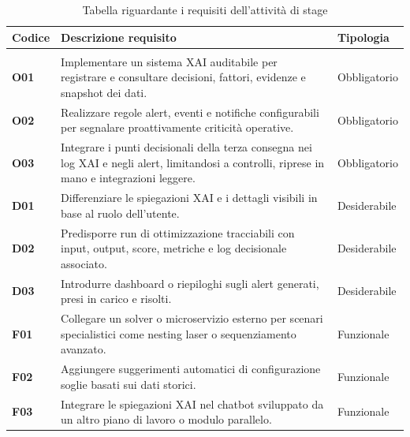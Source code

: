 \begin{center}
    \keepXColumns
        \begin{longtable}{|l|p{}|l|}
            \hline
            \rowcolor{gold}
            \textbf{Codice} & \textbf{Descrizione requisito} & \textbf{Tipologia} \\
            \hline
            \endhead

            \hline
            \rowcolor{white}
            \caption{Tabella riguardante i requisiti dell'attività di stage} \label{tab:requisiti_stage} \\
            \endlastfoot 

            \textbf{O01} & Implementare un sistema XAI auditabile per registrare e consultare decisioni, fattori, evidenze e snapshot dei dati. & Obbligatorio\\
            \hline
            \textbf{O02} & Realizzare regole alert, eventi e notifiche configurabili per segnalare proattivamente criticità operative. & Obbligatorio\\
            \hline
            \textbf{O03} & Integrare i punti decisionali della terza consegna nei log XAI e negli alert, limitandosi a controlli, riprese in mano e integrazioni leggere. & Obbligatorio\\
            \hline
            \textbf{D01} & Differenziare le spiegazioni XAI e i dettagli visibili in base al ruolo dell'utente. & Desiderabile\\
            \hline
            \textbf{D02} & Predisporre run di ottimizzazione tracciabili con input, output, score, metriche e log decisionale associato. & Desiderabile\\
            \hline
            \textbf{D03} & Introdurre dashboard o riepiloghi sugli alert generati, presi in carico e risolti. & Desiderabile\\
            \hline
            \textbf{F01} & Collegare un solver o microservizio esterno per scenari specialistici come nesting laser o sequenziamento avanzato. & Funzionale\\
            \hline
            \textbf{F02} & Aggiungere suggerimenti automatici di configurazione soglie basati sui dati storici. & Funzionale\\
            \hline
            \textbf{F03} & Integrare le spiegazioni XAI nel chatbot sviluppato da un altro piano di lavoro o modulo parallelo. & Funzionale\\
            \hline
        \end{longtable}
\end{center}

